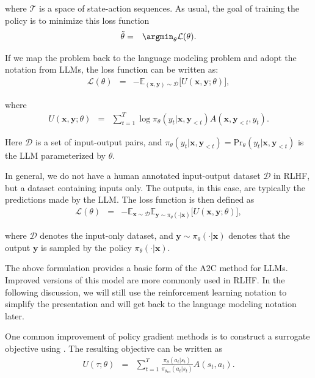 \noindent where $\mathcal{T}$ is a space of state-action sequences. As usual, the goal of training the policy is to minimize this loss function
\begin{eqnarray}
\tilde{\theta} & = & \argmin_{\theta} \mathcal{L}(\theta).
\end{eqnarray}

If we map the problem back to the language modeling problem and adopt the notation from LLMs, the loss function can be written as:
\begin{eqnarray}
\mathcal{L}(\theta) & = & -\mathbb{E}_{(\mathbf{x},\mathbf{y}) \sim \mathcal{D}} \big[ U(\mathbf{x},\mathbf{y};\theta) \big],
\end{eqnarray}

\noindent where
\begin{eqnarray}
U(\mathbf{x},\mathbf{y};\theta) & = & \sum_{t=1}^{T} \log \pi_{\theta}(y_t|\mathbf{x},\mathbf{y}_{<t}) A(\mathbf{x},\mathbf{y}_{<t},y_t).
\end{eqnarray}

\noindent Here $\mathcal{D}$ is a set of input-output pairs, and $\pi_{\theta}(y_t|\mathbf{x},\mathbf{y}_{<t}) = \mathrm{Pr}_{\theta}(y_t|\mathbf{x},\mathbf{y}_{<t})$ is the LLM parameterized by $\theta$.

In general, we do not have a human annotated input-output dataset $\mathcal{D}$ in RLHF, but a dataset containing inputs only. The outputs, in this case, are typically the predictions made by the LLM. The loss function is then defined as
\begin{eqnarray}
\mathcal{L}(\theta) & = & -\mathbb{E}_{\mathbf{x} \sim \mathcal{D}} \mathbb{E}_{\mathbf{y} \sim \pi_{\theta}(\cdot|\mathbf{x})} \big[ U(\mathbf{x},\mathbf{y};\theta) \big],
\end{eqnarray}

\noindent where $\mathcal{D}$ denotes the input-only dataset, and $\mathbf{y} \sim \pi_{\theta}(\cdot|\mathbf{x})$ denotes that the output $\mathbf{y}$ is sampled by the policy $\pi_{\theta}(\cdot|\mathbf{x})$.

The above formulation provides a basic form of the A2C method for LLMs. Improved versions of this model are more commonly used in RLHF. In the following discussion, we will still use the reinforcement learning notation to simplify the presentation and will get back to the language modeling notation later.

One common improvement of policy gradient methods is to construct a surrogate objective using . The resulting objective can be written as
\begin{eqnarray}
U(\tau;\theta) & = &  \sum_{t=1}^{T} \frac{\pi_{\theta}(a_t|s_t)}{\pi_{\theta_{\mathrm{ref}}}(a_t|s_t)} A(s_t,a_t).
\end{eqnarray}

